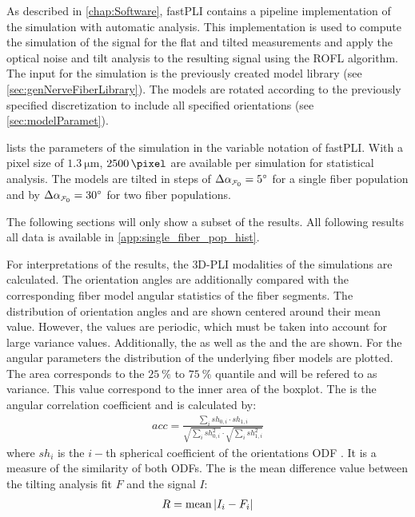 %
As described in \cref{chap:Software}, \ac{fastPLI} contains a pipeline implementation of the simulation with automatic analysis.
This implementation is used to compute the simulation of the signal for the flat and tilted measurements and apply the optical noise and tilt analysis to the resulting signal using the \ac{ROFL} algorithm. 
The input for the simulation is the previously created model library (see \cref{sec:genNerveFiberLibrary}).
The models are rotated according to the previously specified discretization to include all specified orientations (see \cref{sec:modelParamet}).
\par
% 
 lists the parameters of the simulation in the variable notation of \ac{fastPLI}.
With a pixel size of $\SI{1.3}{\micro\meter}$, $\SI{2500}{\pixel}$ are available per simulation for statistical analysis.
The models are tilted in steps of $\Delta \modelInc = \SI{5}{\degree}$ for a single fiber population and by $\Delta \modelInc = \SI{30}{\degree}$ for two fiber populations.
\par
% 
The following sections will only show a subset of the results. 
All following results all data is available in \cref{app:single_fiber_pop_hist}.
\par
% 
For interpretations of the results, the \ac{3D-PLI} modalities of the simulations are calculated.
The orientation angles are additionally compared with the corresponding fiber model angular statistics of the fiber segments.
The distribution of orientation angles \dir{} and \inc{} are shown centered around their mean value.
However, the values are periodic, which must be taken into account for \eg{} large variance values.
Additionally, the \openingAngle{} as well as the \accvalue{} and the \rvalue{} are shown.
For the angular parameters the distribution of the underlying fiber models are plotted.
The area corresponds to the $\SI{25}{\percent}$ to $\SI{75}{\percent}$ quantile and will be refered to as \bvariance{} variance.
This value correspond to the inner area of the boxplot.
The \accvalue{} is the angular correlation coefficient and is calculated by:
\begin{align}
    acc = \frac{\sum_i{\mathit{sh}_{0,i} \cdot \mathit{sh}_{1,i}}}{\sqrt{\sum_i{\mathit{sh}_{0,i}^2}} \cdot \sqrt{\sum_i{\mathit{sh}_{1,i}^2}}}
\end{align}
where $\mathit{sh}_i$ is the $i-$th spherical coefficient of the orientations \ac{ODF} \cite{Schilling2018}.
It is a measure of the similarity of both \acp{ODF}.
The \rvalue{} is the mean difference value between the tilting analysis fit $F$ and the signal $I$:
\begin{align}
    R = \operatorname{mean}{|I_i-F_i|}
\end{align}
\par
% 
% 
% 
